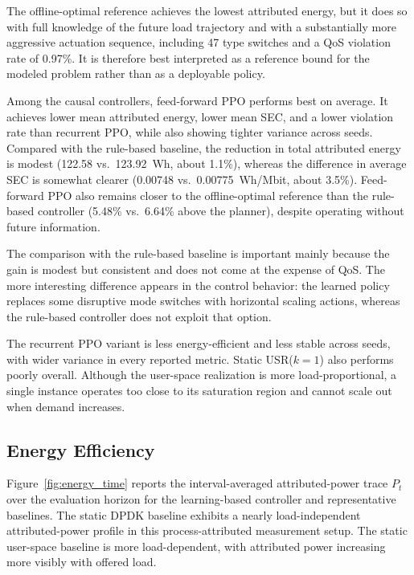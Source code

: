 \documentclass[a4paper,fleqn]{cas-sc}
\begin{document}
The offline-optimal reference achieves the lowest attributed energy, but it does so with full knowledge of the future load trajectory and with a substantially more aggressive actuation sequence, including 47 type switches and a QoS violation rate of 0.97\%. It is therefore best interpreted as a reference bound for the modeled problem rather than as a deployable policy.

Among the causal controllers, feed-forward PPO performs best on average. It achieves lower mean attributed energy, lower mean SEC, and a lower violation rate than recurrent PPO, while also showing tighter variance across seeds. Compared with the rule-based baseline, the reduction in total attributed energy is modest (122.58 vs.\ 123.92~Wh, about 1.1\%), whereas the difference in average SEC is somewhat clearer (0.00748 vs.\ 0.00775~Wh/Mbit, about 3.5\%). Feed-forward PPO also remains closer to the offline-optimal reference than the rule-based controller (5.48\% vs.\ 6.64\% above the planner), despite operating without future information.

The comparison with the rule-based baseline is important mainly because the gain is modest but consistent and does not come at the expense of QoS. The more interesting difference appears in the control behavior: the learned policy replaces some disruptive mode switches with horizontal scaling actions, whereas the rule-based controller does not exploit that option.

The recurrent PPO variant is less energy-efficient and less stable across seeds, with wider variance in every reported metric. Static USR($k=1$) also performs poorly overall. Although the user-space realization is more load-proportional, a single instance operates too close to its saturation region and cannot scale out when demand increases.

\subsection{Energy Efficiency}
\label{subsec:energy_results}

Figure~\ref{fig:energy_time} reports the interval-averaged attributed-power trace $P_t$ over the evaluation horizon for the learning-based controller and representative baselines. The static DPDK baseline exhibits a nearly load-independent attributed-power profile in this process-attributed measurement setup. The static user-space baseline is more load-dependent, with attributed power increasing more visibly with offered load.
\end{document}
